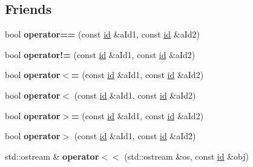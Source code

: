 \subsection*{Friends}
\begin{DoxyCompactItemize}
\item 
bool {\bfseries operator==} (const \hyperlink{classtthread_1_1thread_1_1id}{id} \&a\+Id1, const \hyperlink{classtthread_1_1thread_1_1id}{id} \&a\+Id2)\hypertarget{classtthread_1_1thread_1_1id_ab97e9df94267708c400d5c9253d2c9a5}{}\label{classtthread_1_1thread_1_1id_ab97e9df94267708c400d5c9253d2c9a5}

\item 
bool {\bfseries operator!=} (const \hyperlink{classtthread_1_1thread_1_1id}{id} \&a\+Id1, const \hyperlink{classtthread_1_1thread_1_1id}{id} \&a\+Id2)\hypertarget{classtthread_1_1thread_1_1id_a2d92fae7113ae661d1ee252d47dfa053}{}\label{classtthread_1_1thread_1_1id_a2d92fae7113ae661d1ee252d47dfa053}

\item 
bool {\bfseries operator$<$=} (const \hyperlink{classtthread_1_1thread_1_1id}{id} \&a\+Id1, const \hyperlink{classtthread_1_1thread_1_1id}{id} \&a\+Id2)\hypertarget{classtthread_1_1thread_1_1id_a8699ae4118ddf64b72ac962c0ca080ce}{}\label{classtthread_1_1thread_1_1id_a8699ae4118ddf64b72ac962c0ca080ce}

\item 
bool {\bfseries operator$<$} (const \hyperlink{classtthread_1_1thread_1_1id}{id} \&a\+Id1, const \hyperlink{classtthread_1_1thread_1_1id}{id} \&a\+Id2)\hypertarget{classtthread_1_1thread_1_1id_a178cb516ec0247f46efbb897379d57c4}{}\label{classtthread_1_1thread_1_1id_a178cb516ec0247f46efbb897379d57c4}

\item 
bool {\bfseries operator$>$=} (const \hyperlink{classtthread_1_1thread_1_1id}{id} \&a\+Id1, const \hyperlink{classtthread_1_1thread_1_1id}{id} \&a\+Id2)\hypertarget{classtthread_1_1thread_1_1id_a92edc8303fd80f98cf5abf7ca724453d}{}\label{classtthread_1_1thread_1_1id_a92edc8303fd80f98cf5abf7ca724453d}

\item 
bool {\bfseries operator$>$} (const \hyperlink{classtthread_1_1thread_1_1id}{id} \&a\+Id1, const \hyperlink{classtthread_1_1thread_1_1id}{id} \&a\+Id2)\hypertarget{classtthread_1_1thread_1_1id_abc89be9fcc4fe1a6d98d89fd15db8388}{}\label{classtthread_1_1thread_1_1id_abc89be9fcc4fe1a6d98d89fd15db8388}

\item 
std\+::ostream \& {\bfseries operator$<$$<$} (std\+::ostream \&os, const \hyperlink{classtthread_1_1thread_1_1id}{id} \&obj)\hypertarget{classtthread_1_1thread_1_1id_aa3ab765c93d37be7ea34c6c1394f5c82}{}\label{classtthread_1_1thread_1_1id_aa3ab765c93d37be7ea34c6c1394f5c82}

\end{DoxyCompactItemize}


